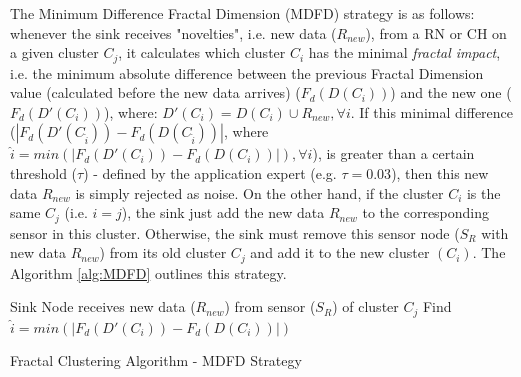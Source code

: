 \documentclass[conference]{IEEEtran}
\begin{document}
The Minimum Difference Fractal Dimension (MDFD) strategy is as follows:
whenever the sink receives "novelties", i.e. new data ($R_{new}$), from a RN or CH on
a given cluster $C_j$, it calculates which cluster $C_i$ has the minimal
\textit{fractal impact}, i.e. the minimum absolute difference between the
previous Fractal Dimension value (calculated before the new data arrives)
($F_d(D(C_i))$) and the new one ($F_d(D'(C_i))$), where: $D'(C_i) = D(C_i) \cup
R_{new}, \forall i$.
If this minimal difference ($|F_d(D'(C_{\hat{i}})) - F_d(D(C_{\hat{i}}))|$,
where $\hat{i} = min(|F_d(D'(C_i)) - F_d(D(C_i))|), \forall i$), is greater than
a certain threshold ($\tau$) - defined by the application expert (e.g. $\tau = 0.03$), then this new data $R_{new}$ is simply rejected as noise.
On the other hand, if the cluster $C_i$ is the same $C_j$ (i.e. $i=j$), the
sink just add the new data $R_{new}$ to the corresponding sensor in this cluster.
Otherwise, the sink must remove this sensor node ($S_{R}$ with new data
$R_{new}$) from its old cluster $C_j$ and add it to the new cluster $(C_i)$.
The Algorithm \ref{alg:MDFD} outlines this strategy.


\begin{algorithm}
 \SetAlgoLined
 \LinesNumbered
 Sink Node receives new data ($R_{new}$) from sensor ($S_{R}$) of cluster $C_j$\;
  Find $\hat{i} = min(|F_d(D'(C_i)) - F_d(D(C_i))|)$\;
 
 \caption{Fractal Clustering Algorithm - MDFD Strategy}
 \label{alg:MDFD}
\end{algorithm}
\end{document}

